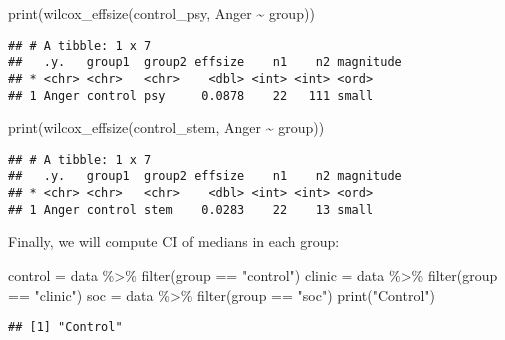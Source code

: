 \documentclass[
]{article}
\newenvironment{Shaded}{\begin{snugshade}}{\end{snugshade}}
\newcommand{\FunctionTok}[1]{\textcolor[rgb]{0.00,0.00,0.00}{#1}}
\newcommand{\NormalTok}[1]{#1}
\newcommand{\OtherTok}[1]{\textcolor[rgb]{0.56,0.35,0.01}{#1}}
\newcommand{\SpecialCharTok}[1]{\textcolor[rgb]{0.00,0.00,0.00}{#1}}
\newcommand{\StringTok}[1]{\textcolor[rgb]{0.31,0.60,0.02}{#1}}
\begin{document}
\begin{Shaded}
\begin{Highlighting}[]
\FunctionTok{print}\NormalTok{(}\FunctionTok{wilcox\_effsize}\NormalTok{(control\_psy, Anger }\SpecialCharTok{\textasciitilde{}}\NormalTok{ group))}
\end{Highlighting}
\end{Shaded}

\begin{verbatim}
## # A tibble: 1 x 7
##   .y.   group1  group2 effsize    n1    n2 magnitude
## * <chr> <chr>   <chr>    <dbl> <int> <int> <ord>    
## 1 Anger control psy     0.0878    22   111 small
\end{verbatim}

\begin{Shaded}
\begin{Highlighting}[]
\FunctionTok{print}\NormalTok{(}\FunctionTok{wilcox\_effsize}\NormalTok{(control\_stem, Anger }\SpecialCharTok{\textasciitilde{}}\NormalTok{ group))}
\end{Highlighting}
\end{Shaded}

\begin{verbatim}
## # A tibble: 1 x 7
##   .y.   group1  group2 effsize    n1    n2 magnitude
## * <chr> <chr>   <chr>    <dbl> <int> <int> <ord>    
## 1 Anger control stem    0.0283    22    13 small
\end{verbatim}

Finally, we will compute CI of medians in each group:

\begin{Shaded}
\begin{Highlighting}[]
\NormalTok{control }\OtherTok{=}\NormalTok{ data }\SpecialCharTok{\%\textgreater{}\%} \FunctionTok{filter}\NormalTok{(group }\SpecialCharTok{==} \StringTok{"control"}\NormalTok{)}
\NormalTok{clinic }\OtherTok{=}\NormalTok{ data }\SpecialCharTok{\%\textgreater{}\%} \FunctionTok{filter}\NormalTok{(group }\SpecialCharTok{==} \StringTok{"clinic"}\NormalTok{)}
\NormalTok{soc }\OtherTok{=}\NormalTok{ data }\SpecialCharTok{\%\textgreater{}\%} \FunctionTok{filter}\NormalTok{(group }\SpecialCharTok{==} \StringTok{"soc"}\NormalTok{)}
\FunctionTok{print}\NormalTok{(}\StringTok{"Control"}\NormalTok{)}
\end{Highlighting}
\end{Shaded}

\begin{verbatim}
## [1] "Control"
\end{verbatim}
\end{document}
